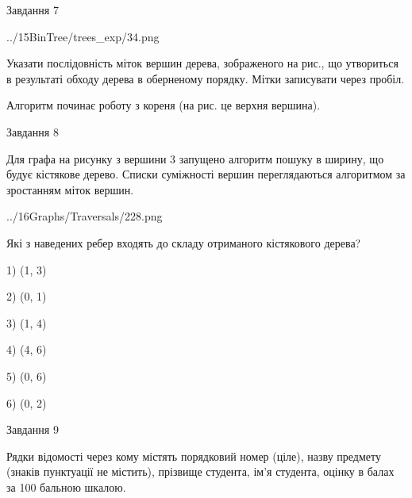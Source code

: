 \documentclass[12pt, ukrainian]{article}
\begin{document}
{\vspace{10mm}\par

\newpage
\begin{minipage}[t]{9.7cm}
               
{\begin{center}Завдання {7}\end{center}}
\vspace{-4mm}

\begin{center}
	{../15BinTree/trees_exp/34.png}
\end{center}
Указати послідовність міток вершин дерева, зображеного на рис., що утвориться в результаті обходу дерева в оберненому порядку. Мітки записувати через пробіл.\par Алгоритм починає роботу з кореня (на рис. це верхня вершина).\par

\end{minipage}
\vline \hspace{8mm}
\begin{minipage}[t]{8.0cm}
               
{\begin{center}Завдання {8}\end{center}}
\vspace{-4mm}
Для графа на рисунку з вершини 3 запущено алгоритм пошуку в ширину, що будує кістякове дерево. Списки суміжності вершин переглядаються алгоритмом за зростанням міток вершин.\par
\begin{center}
	{../16Graphs/Traversals/228.png}
\end{center}
\par Які з наведених ребер входять до складу отриманого кістякового дерева?\par
1) (1, 3)\par
2) (0, 1)\par
3) (1, 4)\par
4) (4, 6)\par
5) (0, 6)\par
6) (0, 2)\par
{\vskip 15pt} \par

\end{minipage}

               
{\begin{center}Завдання {9}\end{center}}
\vspace{-4mm}
Рядки відомості через кому містять порядковий номер (ціле), назву предмету (зна\-ків пунктуації не містить), прізвище студента, ім'я студента, оцінку в балах за 100 бальною шкалою.

}
\end{document}
